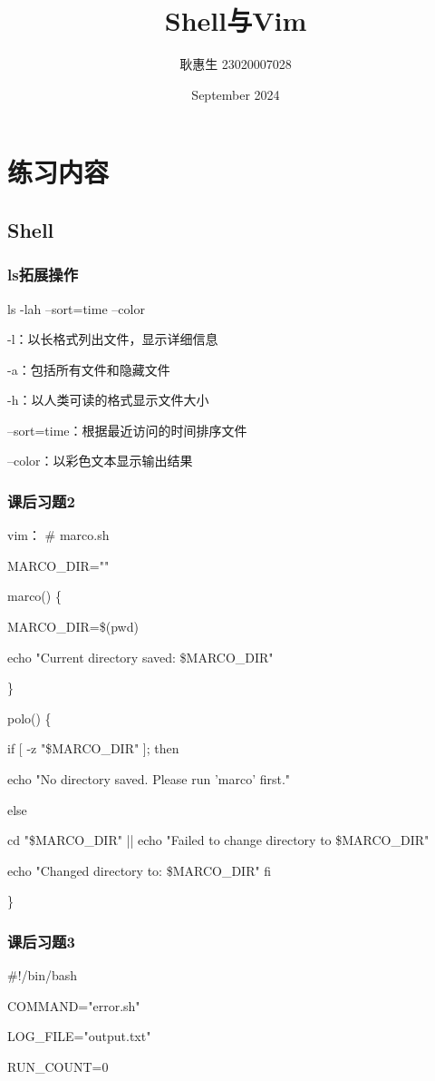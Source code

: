 \documentclass{ctexart}
\title{Shell与Vim}
\author{耿惠生 23020007028}
\date{September 2024}
\begin{document}
\maketitle

\section{练习内容}
\subsection{Shell}
\subsubsection{ls拓展操作}
ls -lah --sort=time --color  

-l：以长格式列出文件，显示详细信息

-a：包括所有文件和隐藏文件 

-h：以人类可读的格式显示文件大小 

--sort=time：根据最近访问的时间排序文件 

--color：以彩色文本显示输出结果 
\subsubsection{课后习题2}
vim：
\# marco.sh 

 MARCO\_DIR="" 

 
 marco() \{ 
 
 MARCO\_DIR=\$(pwd)
 
 echo "Current directory saved: \$MARCO\_DIR"
 
 \}
 
 polo() \{ 
 
 if [ -z "\$MARCO\_DIR" ]; then
 
 echo "No directory saved. Please run 'marco' first."
 
 else 
 
 cd "\$MARCO\_DIR" || echo "Failed to change directory to \$MARCO\_DIR"
 
 echo "Changed directory to: \$MARCO\_DIR" fi 
 
 \}  
\subsubsection{课后习题3}
\#!/bin/bash 

COMMAND="error.sh"


LOG\_FILE="output.txt"

RUN\_COUNT=0 
\end{document}
